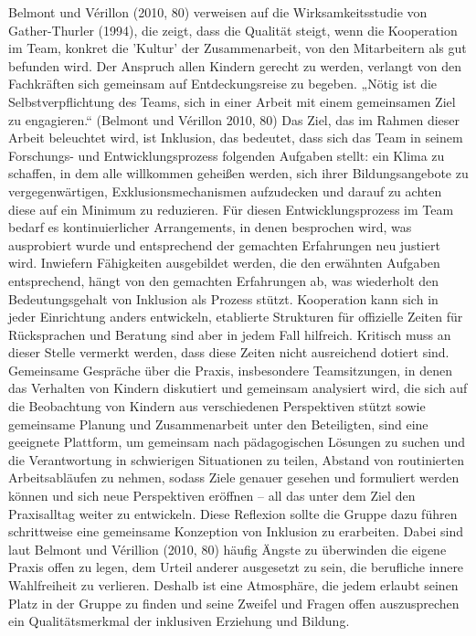 Belmont und Vérillon (2010, 80) verweisen auf die Wirksamkeitsstudie von Gather-Thurler (1994), die zeigt, dass die Qualität steigt, wenn die Kooperation im Team, konkret die 'Kultur' der Zusammenarbeit, von den Mitarbeitern als gut befunden wird.  
Der Anspruch allen Kindern gerecht zu werden, verlangt von den Fachkräften sich gemeinsam auf Entdeckungsreise zu begeben. „Nötig ist die Selbstverpflichtung des Teams, sich in einer Arbeit mit einem gemeinsamen Ziel zu engagieren.“ (Belmont und Vérillon 2010, 80) Das Ziel, das im Rahmen dieser Arbeit beleuchtet wird, ist Inklusion, das bedeutet, dass sich das Team in seinem Forschungs- und Entwicklungsprozess folgenden Aufgaben stellt: 
ein Klima zu schaffen, in dem alle willkommen geheißen werden, sich ihrer Bildungsangebote zu vergegenwärtigen, Exklusionsmechanismen aufzudecken und darauf zu achten diese auf ein Minimum zu reduzieren.
Für diesen Entwicklungsprozess im Team bedarf es kontinuierlicher Arrangements, in denen besprochen wird, was ausprobiert wurde und entsprechend der gemachten Erfahrungen neu justiert wird. Inwiefern Fähigkeiten ausgebildet werden, die den erwähnten Aufgaben entsprechend, hängt von den gemachten Erfahrungen ab, was wiederholt den Bedeutungsgehalt von Inklusion als Prozess stützt. 
Kooperation kann sich in jeder Einrichtung anders entwickeln, etablierte Strukturen für offizielle Zeiten für Rücksprachen und Beratung sind aber in jedem Fall hilfreich. Kritisch muss an dieser Stelle vermerkt werden, dass diese Zeiten nicht ausreichend dotiert sind.
Gemeinsame Gespräche über die Praxis, insbesondere Teamsitzungen, in denen das Verhalten von Kindern diskutiert und gemeinsam analysiert wird, die sich auf die Beobachtung von Kindern aus verschiedenen Perspektiven stützt sowie gemeinsame Planung und Zusammenarbeit unter den Beteiligten, sind eine geeignete Plattform, um gemeinsam nach pädagogischen Lösungen zu suchen und die Verantwortung in schwierigen Situationen zu teilen, Abstand von routinierten Arbeitsabläufen zu nehmen, sodass Ziele genauer gesehen und formuliert werden können und sich neue Perspektiven eröffnen – all das unter dem Ziel den Praxisalltag weiter zu entwickeln.
Diese Reflexion sollte die Gruppe dazu führen schrittweise eine gemeinsame Konzeption von Inklusion zu erarbeiten.
Dabei sind laut Belmont und Vérillion (2010, 80) häufig Ängste zu überwinden die eigene Praxis offen zu legen, dem Urteil anderer ausgesetzt zu sein, die berufliche innere Wahlfreiheit zu verlieren. Deshalb ist eine Atmosphäre, die jedem erlaubt seinen Platz in der Gruppe zu finden und seine Zweifel und Fragen offen auszusprechen ein Qualitätsmerkmal der inklusiven Erziehung und Bildung.

